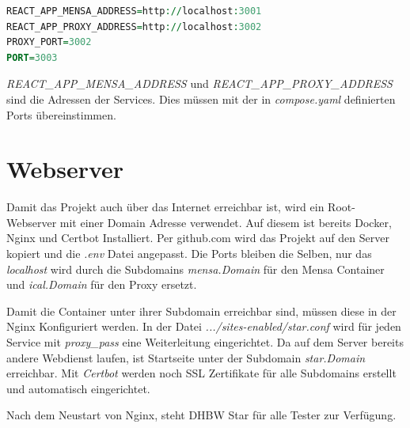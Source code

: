 \begin{lstlisting}[language=vhdl,
	frame=single,           % Ein Rahmen um den Code
	framexleftmargin=15pt,  % Rahmen link von den Zahlen
	style=algoBericht,
	label={Dockerfile},
	captionpos=b           % Caption unter den Code setzen
	caption={.env für DHBW-Star}]
REACT_APP_MENSA_ADDRESS=http://localhost:3001 
REACT_APP_PROXY_ADDRESS=http://localhost:3002
PROXY_PORT=3002
PORT=3003
\end{lstlisting}

\emph{REACT\_APP\_MENSA\_ADDRESS} und \emph{REACT\_APP\_PROXY\_ADDRESS} sind die Adressen der Services. Dies müssen mit der in \emph{compose.yaml} definierten Ports übereinstimmen. 

\section{Webserver}
Damit das Projekt auch über das Internet erreichbar ist, wird ein Root-Webserver mit einer Domain Adresse verwendet. Auf diesem ist bereits Docker, Nginx und Certbot Installiert.
Per github.com wird das Projekt auf den Server kopiert und die \emph{.env} Datei angepasst. Die Ports bleiben die Selben, nur das \emph{localhost} wird durch die Subdomains \emph{mensa.Domain} für den Mensa Container und \emph{ical.Domain} für den Proxy ersetzt.

Damit die Container unter ihrer Subdomain erreichbar sind, müssen diese in der Nginx Konfiguriert werden. In der Datei \emph{.../sites-enabled/star.conf} wird für jeden Service mit \emph{proxy\_pass} eine Weiterleitung eingerichtet.
Da auf dem Server bereits andere Webdienst laufen, ist Startseite unter der Subdomain \emph{star.Domain} erreichbar. Mit \emph{Certbot} werden noch SSL Zertifikate für alle Subdomains erstellt und automatisch eingerichtet.

Nach dem Neustart von Nginx, steht DHBW Star für alle Tester zur Verfügung.

